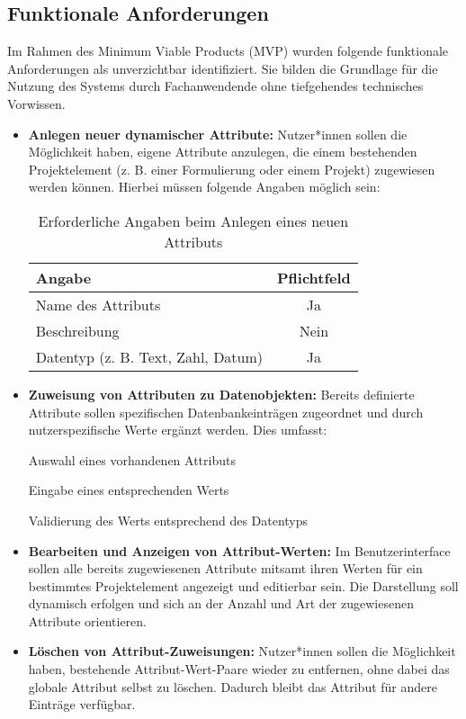 \subsection{Funktionale Anforderungen}
Im Rahmen des Minimum Viable Products (MVP) wurden folgende funktionale Anforderungen als unverzichtbar identifiziert. 
Sie bilden die Grundlage für die Nutzung des Systems durch Fachanwendende ohne tiefgehendes technisches Vorwissen. 
\begin{itemize}
  \item \textbf{Anlegen neuer dynamischer Attribute:}  
Nutzer*innen sollen die Möglichkeit haben, eigene Attribute anzulegen, die einem bestehenden Projektelement 
(z. B. einer Formulierung oder einem Projekt) zugewiesen werden können. Hierbei müssen folgende Angaben möglich sein:

\begin{table}[h!]
\centering
\begin{tabular}{|l|c|}
\hline
\textbf{Angabe}         & \textbf{Pflichtfeld} \\
\hline
Name des Attributs      & Ja               \\
Beschreibung            & Nein                 \\
Datentyp (z. B. Text, Zahl, Datum) & Ja    \\
\hline
\end{tabular}
\caption{Erforderliche Angaben beim Anlegen eines neuen Attributs}
\end{table}

\item \textbf{Zuweisung von Attributen zu Datenobjekten:}  
Bereits definierte Attribute sollen spezifischen Datenbankeinträgen zugeordnet und durch nutzerspezifische Werte ergänzt werden. Dies umfasst:

Auswahl eines vorhandenen Attributs

Eingabe eines entsprechenden Werts

Validierung des Werts entsprechend des Datentyps

\item \textbf{Bearbeiten und Anzeigen von Attribut-Werten:}  
Im Benutzerinterface sollen alle bereits zugewiesenen Attribute mitsamt ihren Werten für ein bestimmtes Projektelement angezeigt und editierbar sein. 
Die Darstellung soll dynamisch erfolgen und sich an der Anzahl und Art der zugewiesenen Attribute orientieren.

\item \textbf{Löschen von Attribut-Zuweisungen:} 
Nutzer*innen sollen die Möglichkeit haben, bestehende Attribut-Wert-Paare wieder zu entfernen, ohne dabei das globale Attribut selbst zu löschen. 
Dadurch bleibt das Attribut für andere Einträge verfügbar.


\end{itemize}
